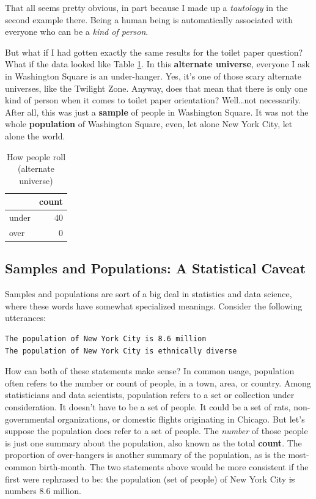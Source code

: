 \documentclass[openany]{book}
\begin{document}
That all seems pretty obvious, in part because I made up a \emph{tautology} in the second example there. Being a human being is automatically associated with everyone who can be a \emph{kind of person}.

But what if I had gotten exactly the same results for the toilet paper question? What if the data looked like Table \ref{tab:tp-redux}. In this \textbf{alternate universe}, everyone I ask in Washington Square is an under-hanger. Yes, it's one of those scary alternate universes, like the Twilight Zone. Anyway, does that mean that there is only one kind of person when it comes to toilet paper orientation? Well\ldots{}not necessarily. After all, this was just a \textbf{sample} of people in Washington Square. It was not the whole \textbf{population} of Washington Square, even, let alone New York City, let alone the world.

\begin{table}[!h]

\caption{\label{tab:tp-redux}How people roll (alternate universe)}
\centering
\begin{tabular}[t]{lr}
\toprule
  & count\\
\midrule
under & 40\\
over & 0\\
\bottomrule
\end{tabular}
\end{table}

\hypertarget{samples-and-populations-a-statistical-caveat}{%
\subsection*{Samples and Populations: A Statistical Caveat}\label{samples-and-populations-a-statistical-caveat}}

Samples and populations are sort of a big deal in statistics and data science, where these words have somewhat specialized meanings. Consider the following utterances:

\begin{verbatim}
The population of New York City is 8.6 million
The population of New York City is ethnically diverse
\end{verbatim}

How can both of these statements make sense? In common usage, population often refers to the number or count of people, in a town, area, or country. Among statisticians and data scientists, population refers to a set or collection under consideration. It doesn't have to be a set of people. It could be a set of rats, non-governmental organizations, or domestic flights originating in Chicago. But let's suppose the population does refer to a set of people. The \emph{number} of those people is just one summary about the population, also known as the total \textbf{count}. The proportion of over-hangers is another summary of the population, as is the most-common birth-month. The two statements above would be more consistent if the first were rephrased to be: the population (set of people) of New York City \sout{is} numbers 8.6 million.
\end{document}
